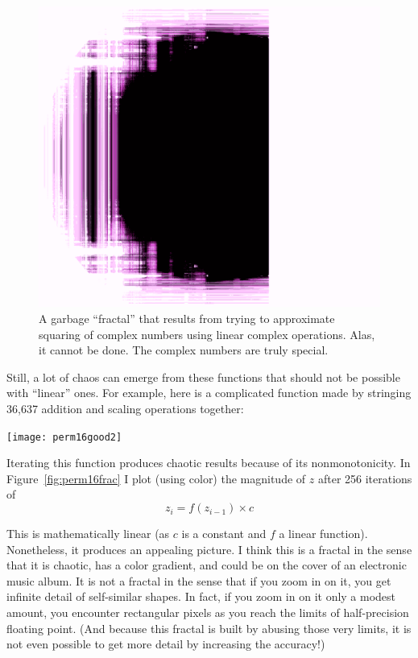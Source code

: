 \documentclass[twocolumn]{article}
\begin{document}
\begin{figure}[tp]
  \begin{center}
    \includegraphics[width=0.95 \linewidth]{squarebrot}
  \end{center}
  \caption{
    A garbage ``fractal'' that results from trying to approximate
    squaring of complex numbers using linear complex operations. Alas, it
    cannot be done. The complex numbers are truly special.
  } \label{fig:squarebrot}
\end{figure}

Still, a lot of chaos can emerge from these functions that should not
be possible with ``linear'' ones. For example, here is a complicated
function made by stringing 36,637 addition and scaling operations
together:

\begin{center}
\texttt{[image: perm16good2]}
\end{center}

Iterating this function produces chaotic results because of its
nonmonotonicity. In Figure~\ref{fig:perm16frac} I plot (using color)
the magnitude of $z$ after 256 iterations of
%
$$z_i = f(z_{i-1}) \times c$$

This is mathematically linear (as $c$ is a constant and $f$ a linear
function). Nonetheless, it produces an appealing picture. I think this
is a fractal in the sense that it is chaotic, has a color gradient,
and could be on the cover of an electronic music album. It is not a
fractal in the sense that if you zoom in on it, you get infinite
detail of self-similar shapes. In fact, if you zoom in on it only a
modest amount, you encounter rectangular pixels as you reach the
limits of half-precision floating point. (And because this fractal is
built by abusing those very limits, it is not even possible to get
more detail by increasing the accuracy!)
\end{document}
